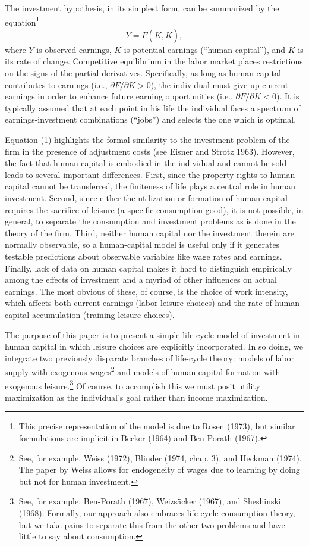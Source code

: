 \documentclass[11pt,fleqn]{article}
\begin{document}
The investment hypothesis, in its simplest form, can be summarized by the equation\footnote{This precise representation of the model is due to Rosen (1973), but similar formulations are implicit in Becker (1964) and Ben-Porath (1967).}
\begin{equation}
Y = F(K, \dot{K}),
\end{equation}
where $Y$ is observed earnings, $K$ is potential earnings (``human capital''), and $\dot{K}$ is its rate of change. Competitive equilibrium in the labor market places restrictions on the signs of the partial derivatives. Specifically, as long as human capital contributes to earnings (i.e., $\partial F/\partial K > 0$), the individual must give up current earnings in order to enhance future earning opportunities (i.e., $\partial F/\partial \dot{K} < 0$). It is typically assumed that at each point in his life the individual faces a spectrum of earnings-investment combinations (``jobs'') and selects the one which is optimal.

Equation (1) highlights the formal similarity to the investment problem of the firm in the presence of adjustment costs (see Eisner and Strotz 1963). However, the fact that human capital is embodied in the individual and cannot be sold leads to several important differences. First, since the property rights to human capital cannot be transferred, the finiteness of life plays a central role in human investment. Second, since either the utilization or formation of human capital requires the sacrifice of leisure (a specific consumption good), it is not possible, in general, to separate the consumption and investment problems as is done in the theory of the firm. Third, neither human capital nor the investment therein are normally observable, so a human-capital model is useful only if it generates testable predictions about observable variables like wage rates and earnings. Finally, lack of data on human capital makes it hard to distinguish empirically among the effects of investment and a myriad of other influences on actual earnings. The most obvious of these, of course, is the choice of work intensity, which affects both current earnings (labor-leisure choices) and the rate of human-capital accumulation (training-leisure choices).

The purpose of this paper is to present a simple life-cycle model of investment in human capital in which leisure choices are explicitly incorporated. In so doing, we integrate two previously disparate branches of life-cycle theory: models of labor supply with exogenous wages\footnote{See, for example, Weiss (1972), Blinder (1974, chap. 3), and Heckman (1974). The paper by Weiss allows for endogeneity of wages due to learning by doing but not for human investment.} and models of human-capital formation with exogenous leisure.\footnote{See, for example, Ben-Porath (1967), Weizsäcker (1967), and Sheshinski (1968). Formally, our approach also embraces life-cycle consumption theory, but we take pains to separate this from the other two problems and have little to say about consumption.} Of course, to accomplish this we must posit utility maximization as the individual's goal rather than income maximization.
\end{document}
